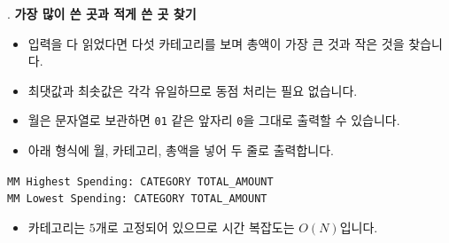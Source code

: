 \begin{frame}{\textbf{\pletter}. \ptitle}
    \textbf{가장 많이 쓴 곳과 적게 쓴 곳 찾기}
\begin{itemize}
        \item 입력을 다 읽었다면 다섯 카테고리를 보며 총액이 가장 큰 것과 작은 것을 찾습니다.
        \item 최댓값과 최솟값은 각각 유일하므로 동점 처리는 필요 없습니다.
        \item 월은 문자열로 보관하면 \texttt{01} 같은 앞자리 \texttt{0}을 그대로 출력할 수 있습니다.
        \item 아래 형식에 월, 카테고리, 총액을 넣어 두 줄로 출력합니다.
    \end{itemize}
    \begin{center}
        \texttt{MM Highest Spending: CATEGORY TOTAL\_AMOUNT}\\[5pt]
        \texttt{MM Lowest Spending: CATEGORY TOTAL\_AMOUNT}
    \end{center}
    \begin{itemize}
        \item 카테고리는 $5$개로 고정되어 있으므로 시간 복잡도는 $O(N)$입니다.
    \end{itemize}
\end{frame}
